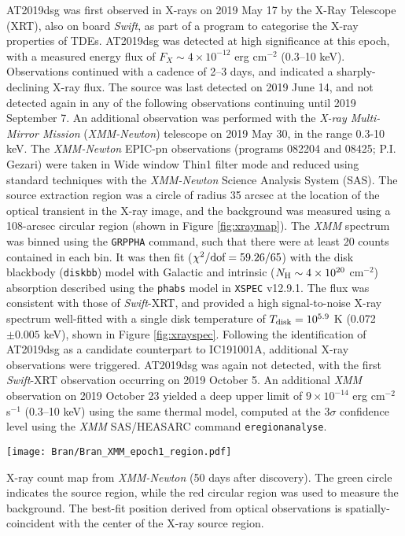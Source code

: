 AT2019dsg was first observed in X-rays on 2019 May 17 by the X-Ray Telescope (XRT)\cite{2005SSRv..120..165B}, also on board \textit{Swift}\cite{2004ApJ...611.1005G}, as part of a program to categorise the X-ray properties of TDEs. AT2019dsg was detected at high significance at this epoch, with a measured energy flux of $F_{X}\sim 4 \times 10^{-12}$ erg cm$^{-2}$ (0.3--10 keV). Observations continued with a cadence of 2--3 days, and indicated a sharply-declining X-ray flux. The source was last detected on 2019 June 14, and not detected again in any of the following observations continuing until 2019 September 7. An additional observation was performed with the \textit{X-ray Multi-Mirror Mission} (\textit{XMM-Newton}) telescope on 2019 May 30, in the range 0.3-10 keV. The \textit{XMM-Newton} EPIC-pn observations (programs 082204 and 08425; P.I. Gezari) were taken in Wide window Thin1 filter mode and reduced using standard techniques with the \textit{XMM-Newton}\cite{2001A&A...365L...1J} Science Analysis System (SAS). The source extraction region was a circle of radius 35 arcsec at the location of the optical transient in the X-ray image, and the background was measured using a 108-arcsec circular region (shown in Figure \ref{fig:xraymap}). The \textit{XMM} spectrum was binned using the \texttt{GRPPHA} command, such that there were at least 20 counts contained in each bin. It was then fit ($\chi^2/\textup{dof}=59.26/65$) with the  disk blackbody (\texttt{diskbb}) model with Galactic\cite{HI4PI2016} and intrinsic ($N_{\textup{H}} \sim 4 \times 10^{20}$ cm$^{-2}$) absorption described using the \texttt{phabs} model in \texttt{XSPEC} v12.9.1\cite{1996ASPC..101...17A}. The flux was consistent with those of \textit{Swift}-XRT, and provided a high signal-to-noise X-ray spectrum well-fitted with a single disk temperature of $T_{\textup{disk}} = 10^{5.9}$ K (0.072 $\pm 0.005$ keV), shown in Figure \ref{fig:xrayspec}. Following the identification of AT2019dsg as a candidate counterpart to IC191001A\cite{2019ATel13160....1S}, additional X-ray observations were triggered. AT2019dsg was again not detected, with the first \textit{Swift}-XRT observation occurring on 2019 October 5. An additional \textit{XMM} observation on 2019 October 23 yielded a deep upper limit of $9 \times 10^{-14}$ erg cm$^{-2}$ s$^{-1}$ (0.3--10 keV) using the same thermal model, computed at the 3$\sigma$ confidence level using the \textit{XMM} SAS/HEASARC command \texttt{eregionanalyse}. 

\begin{marginfigure}
	\centering
	\texttt{[image: Bran/Bran\_XMM\_epoch1\_region.pdf]}
	\caption{X-ray count map from \textit{XMM-Newton} (50 days after discovery). The green circle indicates the source region, while the red circular region was used to measure the background. The best-fit position derived from optical observations is spatially-coincident with the center of the X-ray source region.}
	\label{fig:xraymap}
\end{marginfigure}

